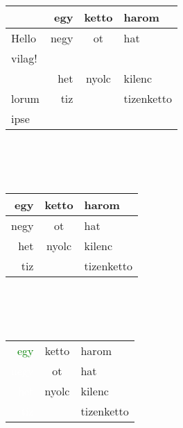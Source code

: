 \documentclass{article}
\begin{document}
\begin{tabular}{l||r|c|l|}
{} & egy & ketto & harom\\
\hline
\hline
Hello & negy & ot & hat\\
vilag! & {} & {} & {}\\
\cline{2-4}
{} & het & nyolc & kilenc\\
\cline{2-2} \cline{4-4}
lorum & tiz & {} & tizenketto\\
ipse & {} & {} & {}\\
\hline
\end{tabular}
\\
\\
\\
\begin{tabular}{r|c|l}
egy & ketto & harom\\
\hline
\rowcolor{yellow}
negy & ot & hat\\
\rowcolor{blue}
het & nyolc & kilenc\\
\rowcolor{yellow}
tiz & {} & tizenketto\\
\end{tabular}
\\
\\
\\
\begin{tabular}{r|cl}
\cellcolor{black}\textcolor{green}{egy} & ketto & harom\\ %
\arrayrulecolor{green}
\hline	
\cellcolor{black}\textcolor{white}{negy} & ot & hat\\
\cellcolor{black}\textcolor{white}{het} & nyolc & \cellcolor{green}kilenc\\
\cellcolor{black}\textcolor{white}{tiz} & {} & tizenketto\\
\end{tabular}
\end{document}
